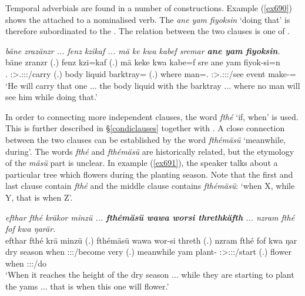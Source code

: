 Temporal adverbials are found in a number of constructions. Example (\ref{ex690}) shows the   attached to a nominalised verb. The  \emph{ane yam fiyoksin} `doing that' is therefore subordinated to the . The relation between the two clauses is one of .

\begin{exe}
	\ex \emph{bäne zrazänzr ... fenz kzikaf ... mä ke kwa kabef sremar \textbf{ane yam fiyoksin}.}\\
	\gll bäne zranzr (.) fenz kzi=kaf (.) mä keke kwa kabe=f sre ane yam fiyok-si=n\\
	\Recog.{\Abs} \Stsg:\Sbj>\Tsg.\F:\Obj:\Irr:\Ipfv/carry (.) {body liquid} barktray={\Prop} (.) where {\Neg} {\Fut} man=\Erg.{\Sg} \Stsg:\Sbj>\Tsg.\Masc:\Obj:\Irr:\Pfv/see {\Dem} event make-\Nmlz={\Loc}\\
	\trans `He will carry that one ... the body liquid with the barktray ... where no man will see him while doing that.'
	\label{ex690}
\end{exe}

In order to connecting more independent clauses, the word \emph{fthé} `if, when' is used. This is further described in {\S}\ref{condiclauses} together with  . A close  connection between the two clauses can be established by the word \emph{fthémäsü} `meanwhile, during'. The words \emph{fthé} and \emph{fthémäsü} are historically related, but the etymology of the \emph{mäsü} part is unclear. In example (\ref{ex691}), the speaker talks about a particular tree which flowers during the planting season. Note that the first and last clause contain \emph{fthé} and the middle clause contains \emph{fthémäsü}: `when X, while Y, that is when Z'.

\begin{exe}
	\ex \emph{efthar fthé kräkor minzü ... \textbf{fthémäsü wawa worsi threthkäfth} ... nzram fthé fof kwa ŋarär.}\\
	\gll efthar fthé krä minzü (.) fthémäsü wawa wor-si threth (.) nzram fthé fof kwa ŋar\\
	{dry season} when \Stsg:\Sbj:\Irr:\Pfv/become very (.) meanwhile yam plant-{\Nmlz} \Stpl:\Sbj>\Stpl:\Obj:\Irr:\Pfv/start (.) flower when {\Emph} {\Fut} \Stsg:\Sbj:\Nonpast:\Ipfv/do\\
	\trans `When it reaches the height of the dry season ... while they are starting to plant the yams ... that is when this one will flower.'
	\label{ex691}
\end{exe}

